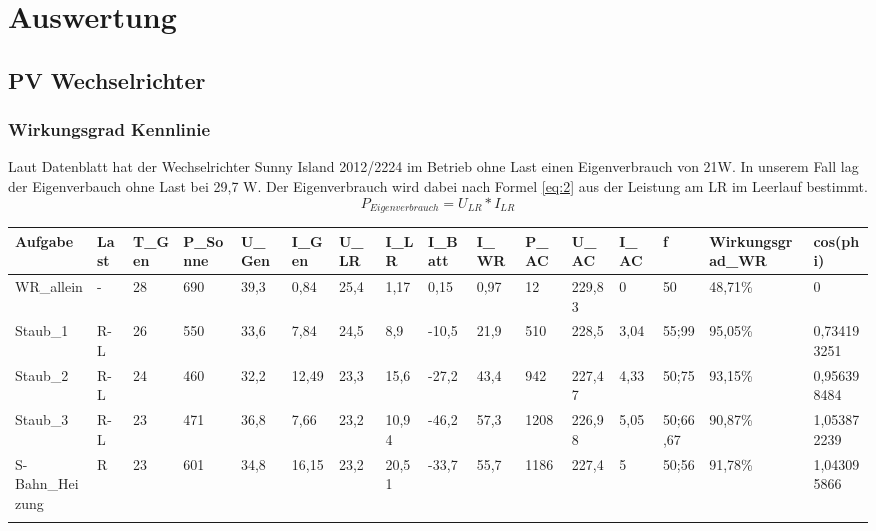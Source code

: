 \section{Auswertung}
\subsection{PV Wechselrichter}
\subsubsection{Wirkungsgrad Kennlinie}
	Laut Datenblatt hat der Wechselrichter Sunny Island 2012/2224 im Betrieb ohne Last einen Eigenverbrauch von 21W. In unserem Fall lag der Eigenverbauch ohne Last bei 29,7 W. Der Eigenverbrauch wird dabei nach Formel \ref{eq:2} aus der Leistung am LR im Leerlauf bestimmt.
%
\begin{equation}
	P_{ Eigenverbrauch }= U_{ LR} * I_{ LR }
\label{eq:2}
\end{equation}
%
\begin{table}[!ht]
    \centering
    \begin{tabular}{|l|l|l|l|l|l|l|l|l|l|l|l|l|l|l|l|}
    \hline
        Aufgabe & Last & T\_Gen & P\_Sonne & U\_Gen & I\_Gen & U\_LR & I\_LR & I\_Batt & I\_WR & P\_AC & U\_AC & I\_AC & f & Wirkungsgrad\_WR & cos(phi) \\ \hline
        WR\_allein & - & 28 & 690 & 39,3 & 0,84 & 25,4 & 1,17 & 0,15 & 0,97 & 12 & 229,83 & 0 & 50 & 48,71\% & 0 \\ \hline
        Staub\_1 & R-L & 26 & 550 & 33,6 & 7,84 & 24,5 & 8,9 & -10,5 & 21,9 & 510 & 228,5 & 3,04 & 55;99 & 95,05\% & 0,734193251 \\ \hline
        Staub\_2 & R-L & 24 & 460 & 32,2 & 12,49 & 23,3 & 15,6 & -27,2 & 43,4 & 942 & 227,47 & 4,33 & 50;75 & 93,15\% & 0,956398484 \\ \hline
        Staub\_3 & R-L & 23 & 471 & 36,8 & 7,66 & 23,2 & 10,94 & -46,2 & 57,3 & 1208 & 226,98 & 5,05 & 50;66,67 & 90,87\% & 1,053872239 \\ \hline
        S-Bahn\_Heizung & R & 23 & 601 & 34,8 & 16,15 & 23,2 & 20,51 & -33,7 & 55,7 & 1186 & 227,4 & 5 & 50;56 & 91,78\% & 1,043095866 \\ \hline
\label{tab:alles}
    \end{tabular}
\end{table}


